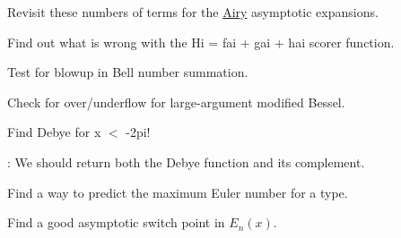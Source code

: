
\begin{DoxyRefList}
\item[Member \mbox{\hyperlink{classemsr_1_1detail_1_1Airy__asymp_a7cd12788ad3367b89793152373d78785}{emsr\+::detail\+::Airy\+\_\+asymp$<$ Tp $>$\+::s\+\_\+absarg\+\_\+lt\+\_\+pio3}} (Cmplx z) const]\label{todo__todo000002}%
%
Revisit these numbers of terms for the \mbox{\hyperlink{classemsr_1_1detail_1_1Airy}{Airy}} asymptotic expansions.  
\item[Member \mbox{\hyperlink{classemsr_1_1detail_1_1AirySeries_a3e6a2ce9fe19fc9b487a2fb1aa536585}{emsr\+::detail\+::Airy\+Series$<$ Tp $>$\+::s\+\_\+\+Scorer}} (Cmplx t)]\label{todo__todo000001}%
%
Find out what is wrong with the Hi = fai + gai + hai scorer function. 
\item[Member \mbox{\hyperlink{namespaceemsr_1_1detail_a35a5118f049937ca96a52fc0c3e04c1c}{emsr\+::detail\+::bell\+\_\+series}} (unsigned int n)]\label{todo__todo000016}%
%
Test for blowup in Bell number summation.  
\item[Member \mbox{\hyperlink{namespaceemsr_1_1detail_a9df333dfbf8d1b80f6dc52f911fa8085}{emsr\+::detail\+::cyl\+\_\+bessel\+\_\+ik\+\_\+steed}} (Tp nu, Tp x, bool do\+\_\+scaled=false)]\label{todo__todo000009}%
%
Check for over/underflow for large-\/argument modified Bessel.  
\item[Member \mbox{\hyperlink{namespaceemsr_1_1detail_abc025f8b35a8ff1495643a919f63db04}{emsr\+::detail\+::debye}} (unsigned int n, Tp x)]\label{todo__todo000019}%
%
Find Debye for x $<$ -\/2pi! 

\label{todo__todo000018}%
%
\+: We should return both the Debye function and it\textquotesingle{}s complement.  
\item[Member \mbox{\hyperlink{namespaceemsr_1_1detail_a4fc7b532f78002dffd704e304523be40}{emsr\+::detail\+::euler\+\_\+series}} (unsigned int n)]\label{todo__todo000003}%
%
Find a way to predict the maximum Euler number for a type.  
\item[Member \mbox{\hyperlink{namespaceemsr_1_1detail_a766c0e20c1b28670a42dbf224e03ce6a}{emsr\+::detail\+::expint}} (unsigned int n, Tp x)]\label{todo__todo000007}%
%
Find a good asymptotic switch point in $ E_n(x) $. 


\end{DoxyRefList}
